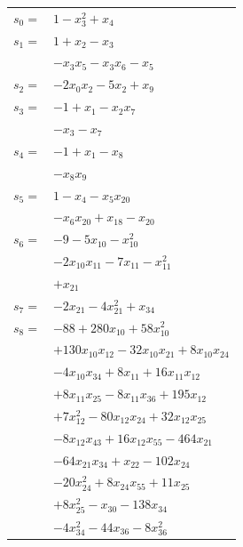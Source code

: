 \begingroup
\small
\setlength{\tabcolsep}{2pt}
\setlength{\LTleft}{0pt}
\begin{longtable}{@{}r@{\;}l@{}}
\(s_{0}=\) & \(\displaystyle 1 -x_{3}^{2} +x_{4}\) \\[3pt]
\(s_{1}=\) & \(\displaystyle 1 +x_{2} -x_{3}\) \\
 & \(\displaystyle -x_{3}x_{5} -x_{3}x_{6} -x_{5}\) \\[3pt]
\(s_{2}=\) & \(\displaystyle -2x_{0}x_{2} -5x_{2} +x_{9}\) \\[3pt]
\(s_{3}=\) & \(\displaystyle -1 +x_{1} -x_{2}x_{7}\) \\
 & \(\displaystyle -x_{3} -x_{7}\) \\[3pt]
\(s_{4}=\) & \(\displaystyle -1 +x_{1} -x_{8}\) \\
 & \(\displaystyle -x_{8}x_{9}\) \\[3pt]
\(s_{5}=\) & \(\displaystyle 1 -x_{4} -x_{5}x_{20}\) \\
 & \(\displaystyle -x_{6}x_{20} +x_{18} -x_{20}\) \\[3pt]
\(s_{6}=\) & \(\displaystyle -9 -5x_{10} -x_{10}^{2}\) \\
 & \(\displaystyle -2x_{10}x_{11} -7x_{11} -x_{11}^{2}\) \\
 & \(\displaystyle +x_{21}\) \\[3pt]
\(s_{7}=\) & \(\displaystyle -2x_{21} -4x_{21}^{2} +x_{34}\) \\[3pt]
\(s_{8}=\) & \(\displaystyle -88 +280x_{10} +58x_{10}^{2}\) \\
 & \(\displaystyle +130x_{10}x_{12} -32x_{10}x_{21} +8x_{10}x_{24}\) \\
 & \(\displaystyle -4x_{10}x_{34} +8x_{11} +16x_{11}x_{12}\) \\
 & \(\displaystyle +8x_{11}x_{25} -8x_{11}x_{36} +195x_{12}\) \\
 & \(\displaystyle +7x_{12}^{2} -80x_{12}x_{24} +32x_{12}x_{25}\) \\
 & \(\displaystyle -8x_{12}x_{43} +16x_{12}x_{55} -464x_{21}\) \\
 & \(\displaystyle -64x_{21}x_{34} +x_{22} -102x_{24}\) \\
 & \(\displaystyle -20x_{24}^{2} +8x_{24}x_{55} +11x_{25}\) \\
 & \(\displaystyle +8x_{25}^{2} -x_{30} -138x_{34}\) \\
 & \(\displaystyle -4x_{34}^{2} -44x_{36} -8x_{36}^{2}\) \\

\end{longtable}
